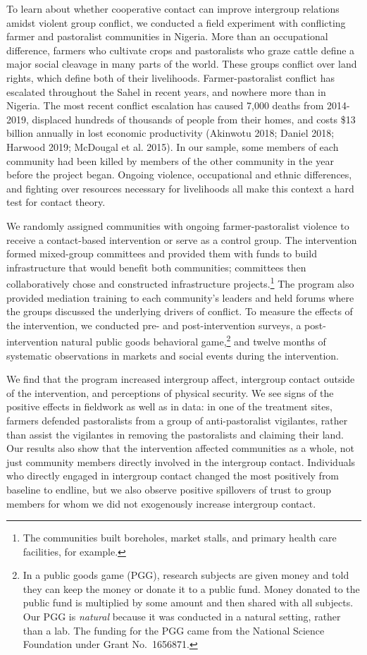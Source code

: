 \documentclass[11pt]{article}
\begin{document}
To learn about whether cooperative contact can improve intergroup
relations amidst violent group conflict, we conducted a field experiment
with conflicting farmer and pastoralist communities in Nigeria. More
than an occupational difference, farmers who cultivate crops and
pastoralists who graze cattle define a major social cleavage in many
parts of the world. These groups conflict over land rights, which define
both of their livelihoods. Farmer-pastoralist conflict has escalated
throughout the Sahel in recent years, and nowhere more than in Nigeria.
The most recent conflict escalation has caused 7,000 deaths from
2014-2019, displaced hundreds of thousands of people from their homes,
and costs \$13 billion annually in lost economic productivity (Akinwotu
2018; Daniel 2018; Harwood 2019; McDougal et al. 2015). In our sample,
some members of each community had been killed by members of the other
community in the year before the project began. Ongoing violence,
occupational and ethnic differences, and fighting over resources
necessary for livelihoods all make this context a hard test for contact
theory.

We randomly assigned communities with ongoing farmer-pastoralist
violence to receive a contact-based intervention or serve as a control
group. The intervention formed mixed-group committees and provided them
with funds to build infrastructure that would benefit both communities;
committees then collaboratively chose and constructed infrastructure
projects.\footnote{The communities built boreholes, market stalls, and
  primary health care facilities, for example.} The program also
provided mediation training to each community's leaders and held forums
where the groups discussed the underlying drivers of conflict. To
measure the effects of the intervention, we conducted pre- and
post-intervention surveys, a post-intervention natural public goods
behavioral game,\footnote{In a public goods game (PGG), research
  subjects are given money and told they can keep the money or donate it
  to a public fund. Money donated to the public fund is multiplied by
  some amount and then shared with all subjects. Our PGG is
  \emph{natural} because it was conducted in a natural setting, rather
  than a lab. The funding for the PGG came from the National Science
  Foundation under Grant No.~1656871.} and twelve months of systematic
observations in markets and social events during the intervention.

We find that the program increased intergroup affect, intergroup contact
outside of the intervention, and perceptions of physical security. We
see signs of the positive effects in fieldwork as well as in data: in
one of the treatment sites, farmers defended pastoralists from a group
of anti-pastoralist vigilantes, rather than assist the vigilantes in
removing the pastoralists and claiming their land. Our results also show
that the intervention affected communities as a whole, not just
community members directly involved in the intergroup contact.
Individuals who directly engaged in intergroup contact changed the most
positively from baseline to endline, but we also observe positive
spillovers of trust to group members for whom we did not exogenously
increase intergroup contact.
\end{document}
